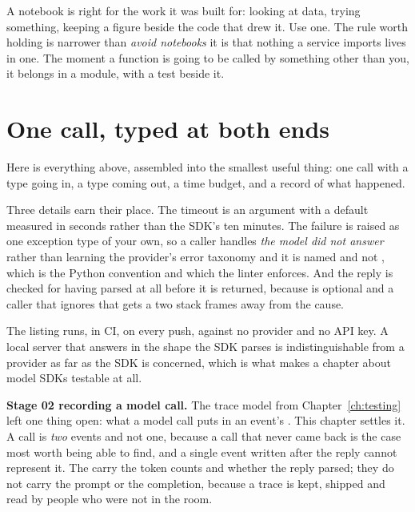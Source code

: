 A notebook is right for the work it was built for: looking at data, trying
something, keeping a figure beside the code that drew it. Use one. The rule
worth holding is narrower than \emph{avoid notebooks} \dash{} it is that
nothing a service imports lives in one. The moment a function is going to be
called by something other than you, it belongs in a module, with a test
beside it.

\section{One call, typed at both ends}
\label{sec:ai-call-model}

Here is everything above, assembled into the smallest useful thing:
one call with a type going in, a type coming out, a time budget, and a
record of what happened.



Three details earn their place. The timeout is an argument with a default
measured in seconds rather than the SDK's ten minutes. The failure is
raised as one exception type of your own, so a caller handles
\emph{the model did not answer} rather than learning the provider's error
taxonomy \dash{} and it is named  and not
, which is the Python convention and which the linter
enforces. And the reply is checked for having parsed at all before it is
returned, because  is optional and a caller that
ignores that gets a  two stack frames away from the cause.


The listing runs, in CI, on every push, against no provider and no API key.
A local server that answers in the shape the SDK parses is indistinguishable
from a provider as far as the SDK is concerned, which is what makes a
chapter about model SDKs testable at all.

\begin{projectbox}
\textbf{Stage 02 \dash{} recording a model call.} The trace model from
Chapter~\ref{ch:testing} left one thing open: what a model call puts in an
event's . This chapter settles it. A call is \emph{two} events
and not one, because a call that never came back is the case most worth
being able to find, and a single event written after the reply cannot
represent it. The  carry the token counts and whether the reply
parsed; they do not carry the prompt or the completion, because a trace is
kept, shipped and read by people who were not in the room.
\end{projectbox}

